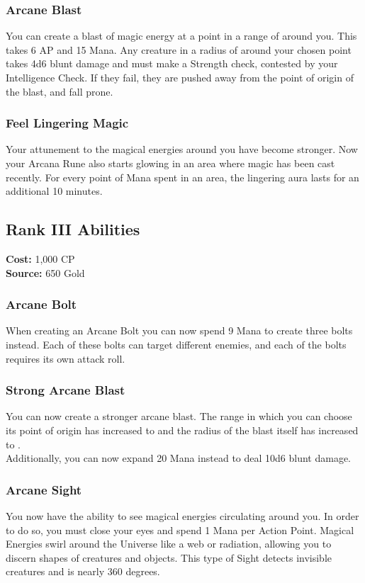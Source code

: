 \subsubsection{Arcane Blast}
You can create a blast of magic energy at a point in a range of  around you.
This takes 6 AP and 15 Mana.
Any creature in a radius of  around your chosen point takes 4d6 blunt damage and must make a Strength check, contested by your Intelligence Check.
If they fail, they are pushed  away from the point of origin of the blast, and fall prone.

\subsubsection{Feel Lingering Magic}
Your attunement to the magical energies around you have become stronger.
Now your Arcana Rune also starts glowing in an area where magic has been cast recently.
For every point of Mana spent in an area, the lingering aura lasts for an additional 10 minutes.

\subsection{Rank III Abilities}
\textbf{Cost:} 1,000 CP\\
\textbf{Source:} 650 Gold
\subsubsection{Arcane Bolt}
When creating an Arcane Bolt you can now spend 9 Mana to create three bolts instead.
Each of these bolts can target different enemies, and each of the bolts requires its own attack roll.

\subsubsection{Strong Arcane Blast}
You can now create a stronger arcane blast.
The range in which you can choose its point of origin has increased to  and the radius of the blast itself has increased to .\\
Additionally, you can now expand 20 Mana instead to deal 10d6 blunt damage.

\subsubsection{Arcane Sight}
You now have the ability to see magical energies circulating around you.
In order to do so, you must close your eyes and spend 1 Mana per Action Point.
Magical Energies swirl around the Universe like a web or radiation, allowing you to discern shapes of creatures and objects.
This type of Sight detects invisible creatures and is nearly 360 degrees.